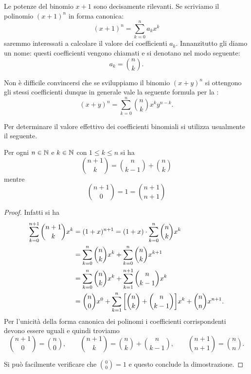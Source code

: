Le potenze del binomio $x+1$ sono decisamente rilevanti. 
Se scriviamo il polinomio $(x+1)^n$ in forma canonica:
\[
  (x+1)^n = \sum_{k=0}^n a_k x^k  
\]
saremmo interessati a calcolare il valore
dei coefficienti $a_k$. 
Innanzitutto gli diamo un nome: questi coefficienti vengono chiamati 
%
e si denotano nel modo seguente:%
%
\[
    a_k = {n \choose k}.
\]

Non è difficile convincersi che se sviluppiamo il binomio $(x+y)^n$
si ottengono gli stessi coefficienti dunque
in generale vale la seguente formula per la :
% 
\begin{equation*}
  (x+y)^n = \sum_{k=0}^n {n \choose k} x^k y^{n-k}. 
\end{equation*}

Per determinare il valore effettivo dei coefficienti 
binomiali si utilizza usualmente il seguente.
  
\begin{theorem}
\mymark{*}%
\label{th:tartaglia}%
Per ogni $n\in {\mathbb N}$ e $k \in {\mathbb N}$ con $1 \le k \le n$ si ha
\[
  {n+1 \choose k} =
      {n \choose k-1} + {n \choose k}
\]
mentre
\[
  {n+1 \choose 0} = 1 = {n+1 \choose n+1}
\]
\end{theorem}
  \begin{proof}
  Infatti si ha 
  \begin{align*}
    \sum_{k=0}^{n+1} {n+1 \choose k} x^k
    &= (1+x)^{n+1} 
    = (1+x)\cdot \sum_{k=0}^n {n \choose k} x^k \\
    &= \sum_{k=0}^n {n\choose k} x^k 
    + \sum_{k=0}^n {n\choose k} x^{k+1}\\
    &= \sum_{k=0}^n {n\choose k} x^k 
    + \sum_{k=1}^{n+1} {n\choose k-1} x^{k}\\
    &= {n\choose 0} x^0 
      + \sum_{k=1}^n {\left[ {n\choose k} + {n\choose k-1} \right]} x^k
      + {n \choose n} x^{n+1}.
    \end{align*}
  Per l'unicità della forma canonica dei polinomi 
  i coefficienti corrispondenti devono essere uguali e quindi 
  troviamo
  \[
  {n+1 \choose 0} = {n \choose 0}, \qquad 
  {n+1 \choose k} = {n \choose k} + {n \choose k-1}, \qquad 
  {n+1 \choose n+1} = {n \choose n}.
  \]

  Si può facilmente verificare che  ${0 \choose 0} = 1$ 
  e questo conclude la dimostrazione.
  \end{proof}
  

